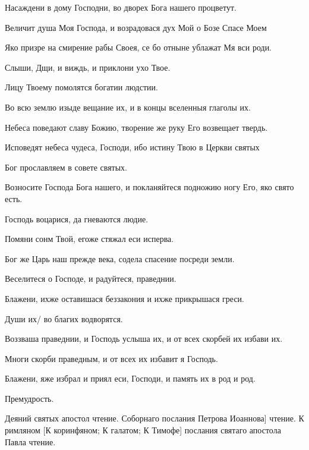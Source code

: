 \begin{mymulticols}
 Насаждени в дому Господни, во дворех Бога нашего процветут.

 Величит душа Моя Господа, и возрадовася дух Мой о Бозе Спасе Моем

 Яко призре на смирение рабы Своея, се бо отныне ублажат Мя вси роди.

 Слыши, Дщи, и виждь, и приклони ухо Твое.

 Лицу Твоему помолятся богатии людстии.

 Во всю землю изыде вещание их, и в концы вселенныя глаголы их.

 Небеса поведают славу Божию, творение же руку Его возвещает твердь.

 Исповедят небеса чудеса, Господи, ибо истину Твою в Церкви святых

 Бог прославляем в совете святых.

 Возносите Господа Бога нашего, и покланяйтеся подножию ногу Его, яко свято есть.

 Господь воцарися, да гневаются людие.

 Помяни сонм Твой, егоже стяжал еси исперва.

 Бог же Царь наш прежде века, содела спасение посреди земли. 

 Веселитеся о Господе, и радуйтеся, праведнии.

 Блажени, ихже оставишася беззакония и ихже прикрышася греси.

 Души их/ во благих водворятся.

 Воззваша праведнии, и Господь услыша их, и от всех скорбей их избави их.

 Многи скорби праведным, и от всех их избавит я Господь.

 Блажени, яже избрал и приял еси, Господи, и память их в род и род.

 Премудрость.

 Деяний святых апостол чтение.  Соборнаго послания Петрова \myemph{ [или:} Иоаннова] чтение.  К римляном [К коринфяном; К галатом; К Тимофе] послания святаго апостола Павла чтение.


\end{mymulticols}
